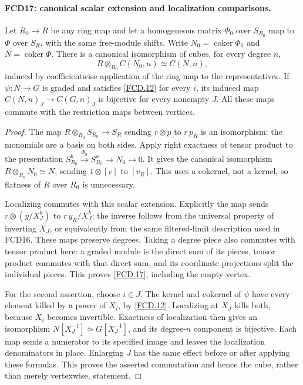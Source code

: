 \documentclass[11pt,a4paper]{article}
\numberwithin{equation}{section}
\theoremstyle{remark}\newtheorem{remark}[theorem]{Remark}
\begin{document}
\paragraph{FCD17: canonical scalar extension and localization comparisons.}
\label{claim:FCD17}
Let $R_0\to R$ be any ring map and let a homogeneous matrix
$\Phi_0$ over $S_{R_0}$ map to $\Phi$ over $S_R$, with the
same free-module shifts.  Write $N_0=\operatorname{coker}\Phi_0$
and $N=\operatorname{coker}\Phi$.  There is a canonical
isomorphism of cubes, for every degree $n$,
\[
 R\otimes_{R_0} C(N_0,n)\simeq C(N,n),               \tag{FCD.17}\label{FCD.17}
\]
induced by coefficientwise application of the ring map to the
representatives.  If $\psi:N\to G$ is graded and satisfies
\eqref{FCD.12} for every $i$, its induced map
$C(N,n)_J\to C(G,n)_J$ is bijective for every nonempty $J$.
All these maps commute with the restriction maps between vertices.

\begin{proof}
The map $R\otimes_{R_0}S_{R_0}\to S_R$ sending
$r\otimes p$ to $r\,p_R$ is an isomorphism: the monomials
are a basis on both sides.  Apply right exactness of tensor
product to the presentation
$S_{R_0}^b\xrightarrow{\Phi_0}S_{R_0}^a\to N_0\to0$.
It gives the canonical isomorphism
$R\otimes_{R_0}N_0\simeq N$, sending
$1\otimes[v]$ to $[v_R]$.  This uses a cokernel, not a
kernel, so flatness of $R$ over $R_0$ is unnecessary.

Localizing commutes with this scalar extension.  Explicitly the
map sends $r\otimes(y/X_J^k)$ to $r\,y_R/X_J^k$;
the inverse follows from the universal property of inverting
$X_J$, or equivalently from the same filtered-limit description
used in FCD16.  These maps preserve degrees.  Taking a degree
piece also commutes with tensor product here: a graded module
is the direct sum of its pieces, tensor product commutes with
that direct sum, and its coordinate projections split the
individual pieces.  This proves \eqref{FCD.17}, including the
empty vertex.

For the second assertion, choose $i\in J$.  The kernel and
cokernel of $\psi$ have every element killed by a power of
$X_i$, by \eqref{FCD.12}.  Localizing at $X_J$ kills both,
because $X_i$ becomes invertible.  Exactness of localization
then gives an isomorphism $N[X_J^{-1}]\simeq G[X_J^{-1}]$,
and its degree-$n$ component is bijective.
Each map sends a numerator to its specified image and leaves
the localization denominators in place.  Enlarging $J$ has
the same effect before or after applying these formulas.
This proves the asserted commutation and hence the cube,
rather than merely vertexwise, statement.
\end{proof}
\end{document}
